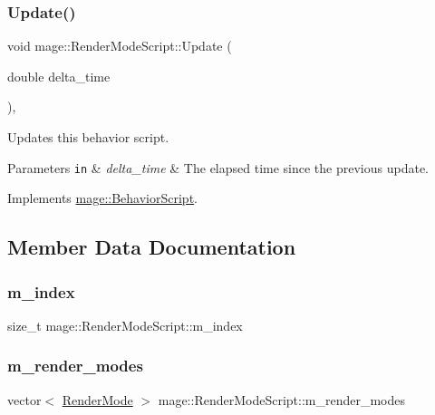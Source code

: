 \subsubsection{\texorpdfstring{Update()}{Update()}}
{\footnotesize\ttfamily void mage\+::\+Render\+Mode\+Script\+::\+Update (\begin{DoxyParamCaption}\item[{double}]{delta\+\_\+time }\end{DoxyParamCaption})\hspace{0.3cm}{\ttfamily [override]}, {\ttfamily [virtual]}}

Updates this behavior script.


\begin{DoxyParams}[1]{Parameters}
\mbox{\tt in}  & {\em delta\+\_\+time} & The elapsed time since the previous update. \\
\hline
\end{DoxyParams}


Implements \hyperlink{classmage_1_1_behavior_script_a905b6c83640cb91d19fecab3435f6feb}{mage\+::\+Behavior\+Script}.



\subsection{Member Data Documentation}
\hypertarget{classmage_1_1_render_mode_script_adf3d1adbc89db76d3541e0b7aed3b3dd}{}\label{classmage_1_1_render_mode_script_adf3d1adbc89db76d3541e0b7aed3b3dd} 
\subsubsection{\texorpdfstring{m\+\_\+index}{m\_index}}
{\footnotesize\ttfamily size\+\_\+t mage\+::\+Render\+Mode\+Script\+::m\+\_\+index\hspace{0.3cm}{\ttfamily [private]}}

\hypertarget{classmage_1_1_render_mode_script_af9256e16f26574b138bf68f00951f702}{}\label{classmage_1_1_render_mode_script_af9256e16f26574b138bf68f00951f702} 
\subsubsection{\texorpdfstring{m\+\_\+render\+\_\+modes}{m\_render\_modes}}
{\footnotesize\ttfamily vector$<$ \hyperlink{namespacemage_a5e7e18b0154373ce8fc942fe3f6b27fd}{Render\+Mode} $>$ mage\+::\+Render\+Mode\+Script\+::m\+\_\+render\+\_\+modes\hspace{0.3cm}{\ttfamily [private]}}

